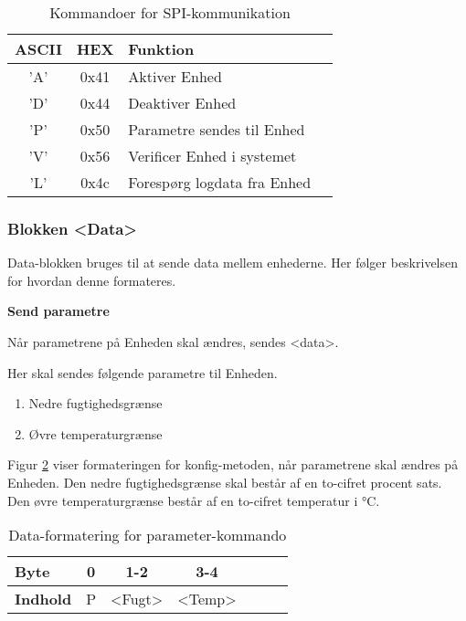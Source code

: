 \begin{table}[H]
\caption{Kommandoer for SPI-kommunikation}
\centering
\begin{tabular}{|c|c|l|c|}
\hline 
\textbf{ASCII} & \textbf{HEX} & \textbf{Funktion} \\ 
\hline 
'A' & 0x41 & Aktiver Enhed \\ 
\hline 
'D' & 0x44 & Deaktiver Enhed \\ 
\hline 
'P' & 0x50 & Parametre sendes til Enhed \\
\hline 
'V' & 0x56 & Verificer Enhed i systemet \\ 
\hline
'L' & 0x4c & Forespørg logdata fra Enhed \\ 
\hline
\end{tabular}
\label{tabel:SWProtokol-kommandoer}
\end{table} 

\subsubsection*{Blokken <Data>}
Data-blokken bruges til at sende data mellem enhederne. Her følger beskrivelsen for hvordan denne formateres. 

\textbf{Send parametre}

Når parametrene på Enheden skal ændres, sendes <data>. 

Her skal sendes følgende parametre til Enheden.

\begin{enumerate}
	\item Nedre fugtighedsgrænse
	\item Øvre temperaturgrænse
\end{enumerate}

Figur \ref{table:SWProtokol-para} viser formateringen for konfig-metoden, når parametrene skal ændres på Enheden. Den nedre fugtighedsgrænse skal består af en to-cifret procent sats. Den øvre temperaturgrænse består af en to-cifret temperatur i °C.

\begin{table}[H]
	\caption{Data-formatering for parameter-kommando}
	\centering
	\begin{tabular}{|l|c|c|c|c|c|c|}
		\hline 
		\textbf{Byte} & 0 & 1-2 & 3-4 \\ 
		\hline 
		\textbf{Indhold} & P & <Fugt> & <Temp> \\ 
		\hline 
	\end{tabular} 
	\label{table:SWProtokol-para}
\end{table}


